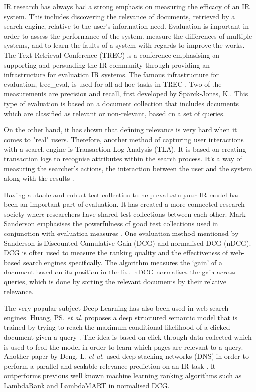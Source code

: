 IR research has always had a strong emphasis on measuring the efficacy of an IR system. This includes discovering the relevance of documents, retrieved by a search engine, relative to the user's information need. Evaluation is important in order to assess the performance of the system, measure the differences of multiple systems, and to learn the faults of a system with regards to improve the works.  The Text Retrieval Conference (TREC) is a conference emphasising on supporting and persuading the IR community through providing an infrastructure for evaluation IR systems. The famous infrastructure for evaluation, trec\_eval, is used for all ad hoc tasks in TREC \cite{voorhees:evaluation}. Two of the measurements are precision and recall, first developed by Spärck-Jones, K.\cite{jones1981information}. This type of evaluation is based on a document collection that includes documents which are classified as relevant or non-relevant, based on a set of queries.

On the other hand, it has shown that defining relevance is very hard when it comes to "real" users\cite{mizzaro1997relevance}. Therefore, another method of capturing user interactions with a search engine is Transaction Log Analysis (TLA). It is based on creating transaction logs to recognise attributes within the search process. It's a way of measuring the searcher's actions, the interaction between the user and the system along with the results \cite{glaser1967discovery}. 

Having a stable and robust test collection to help evaluate your IR model has been an important part of evaluation. It has created a more connected research society where researchers have shared test collections between each other. Mark Sanderson emphasises the powerfulness of good test collections used in conjunction with evaluation measures \cite{sanderson:evaluation}. One evaluation method mentioned by Sanderson is Discounted Cumulative Gain (DCG) and normalised DCG (nDCG)\cite{sanderson:evaluation}. DCG is often used to measure the ranking quality and the effectiveness of web-based search engines specifically. The algorithm measures the ‘gain’ of a document based on its position in the list. nDCG normalises the gain across queries, which is done by sorting the relevant documents by their relative relevance.

The very popular subject Deep Learning has also been used in web search engines. Huang, PS. \emph{et al.} proposes a deep structured semantic model that is trained by trying to reach the maximum conditional likelihood of a clicked document given a query \cite{huang2013learning}. The idea is based on click-through data collected which is used to feed the model in order to learn which pages are relevant to a query. Another paper by Deng, L. \emph{et al.} used deep stacking networks (DNS) in order to perform a parallel and scalable relevance prediction on an IR task \cite{deng2013deep}. It outperforms previous well known machine learning ranking algorithms such as LambdaRank and LambdaMART \cite{burges2010ranknet} in normalised DCG. 


